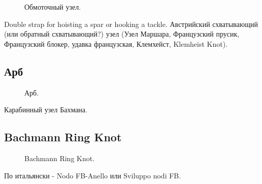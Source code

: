\begin{figure}[H]\centering
	\begin{minipage}{1\linewidth}
		\begin{center}
			\tcbox[enhanced jigsaw,colframe=black,opacityframe=0.5,opacityback=0.5]
			{\centering{}}
		\end{center}
	\end{minipage}
\caption{Обмоточный узел.}
\label{ris:Obmotochny}
\end{figure}

Double strap for hoisting a spar or hooking a tackle. Австрийский схватывающий (или обратный схватывающий?) узел (Узел Маршара, Французский прусик, Французский блокер, удавка французская, Клемхейст, Klemheist Knot).

\subsection{Арб}

\begin{figure}[H]\centering
	\begin{minipage}{1\linewidth}
		\begin{center}
			\tcbox[enhanced jigsaw,colframe=black,opacityframe=0.5,opacityback=0.5]
			{\centering{}}
		\end{center}
	\end{minipage}
\caption{Арб.}
\label{ris:Arb}
\end{figure}

Карабинный узел Бахмана.

\subsection{Bachmann Ring Knot}

\begin{figure}[H]\centering
	\begin{minipage}{1\linewidth}
		\begin{center}
			\tcbox[enhanced jigsaw,colframe=black,opacityframe=0.5,opacityback=0.5]
			{\centering{}}
		\end{center}
	\end{minipage}
\caption{Bachmann Ring Knot.}
\label{ris:Bachmann_Ring_Knot}
\end{figure}

По итальянски - Nodo FB-Anello или Sviluppo nodi FB.

